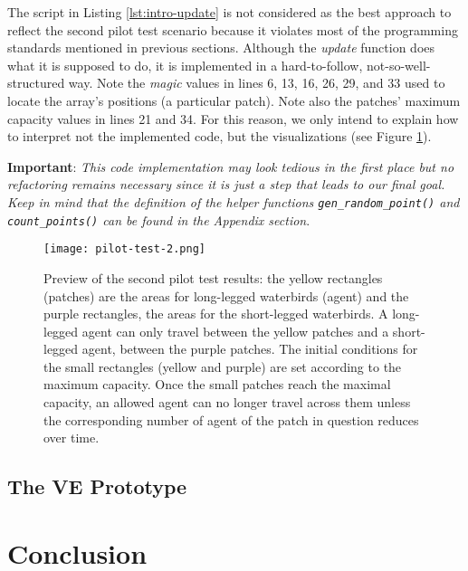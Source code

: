 
The script in Listing \ref{lst:intro-update} is not considered as the best approach to reflect the second pilot test scenario because it violates most of the programming standards mentioned in previous sections. Although the \emph{update} function does what it is supposed to do, it is implemented in a hard-to-follow, not-so-well-structured way. Note the \emph{magic} values in lines 6, 13, 16, 26, 29, and 33 used to locate the array's positions (a particular patch). Note also the patches' maximum capacity values in lines 21 and 34. For this reason, we only intend to explain how to interpret not the implemented code, but the visualizations (see Figure \ref{fig:pilot-test-2}).

\noindent
\textbf{Important}: \textit{This code implementation may look tedious in the first place but no refactoring remains necessary since it is just a step that leads to our final goal. Keep in mind that the definition of the helper functions \texttt{gen\_random\_point()} and \texttt{count\_points()} can be found in the Appendix section}.

\begin{figure}[h!]
    \centering
    \texttt{[image: pilot-test-2.png]}
    \caption{Preview of the second pilot test results: the yellow rectangles (patches) are the areas for long-legged waterbirds (agent) and the purple rectangles, the areas for the short-legged waterbirds. A long-legged agent can only travel between the yellow patches and a short-legged agent, between the purple patches. The initial conditions for the small rectangles (yellow and purple) are set according to the maximum capacity. Once the small patches reach the maximal capacity, an allowed agent can no longer travel across them unless the corresponding number of agent of the patch in question reduces over time.}
    \label{fig:pilot-test-2}
\end{figure}

\subsection{The VE Prototype}

\section{Conclusion}

